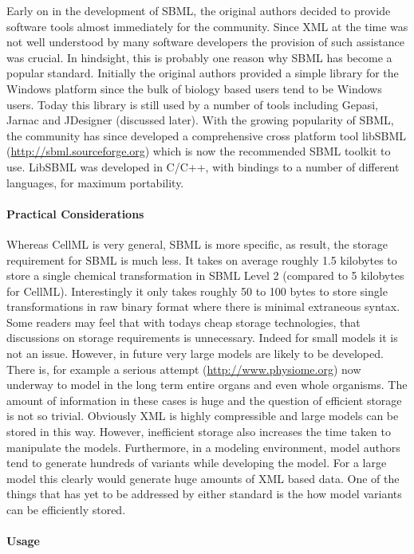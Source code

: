 Early on in the development of SBML, the original authors decided to
provide software tools almost immediately for the community. Since XML
at the time was not well understood by many software developers the
provision of such assistance was crucial. In hindsight, this is probably
one reason why SBML has become a popular standard. Initially the
original authors provided a simple library for the Windows platform
since the bulk of biology based users tend to be Windows users. Today
this library is still used by a number of tools including Gepasi, Jarnac
and JDesigner (discussed later). With the growing popularity of SBML,
the community has since developed a comprehensive cross platform tool
libSBML (\url{http://sbml.sourceforge.org}) which is now the recommended
SBML toolkit to use. LibSBML was developed in C/C++, with bindings to a
number of different languages, for maximum portability.

\paragraph{Practical Considerations}

Whereas CellML is very general, SBML is more specific, as result, the
storage requirement for SBML is much less. It takes on average roughly
1.5 kilobytes to store a single chemical transformation in SBML Level 2
(compared to 5 kilobytes for CellML). Interestingly it only takes
roughly 50 to 100 bytes to store single transformations in raw binary
format where there is minimal extraneous syntax. Some readers may feel
that with todays cheap storage technologies, that discussions on storage
requirements is unnecessary. Indeed for small models it is not an issue.
However, in future very large models are likely to be developed. There
is, for example a serious attempt (\url{http://www.physiome.org}) now
underway to model in the long term entire organs and even whole
organisms. The amount of information in these cases is huge and the
question of efficient storage is not so trivial. Obviously XML is highly
compressible and large models can be stored in this way. However,
inefficient storage also increases the time taken to manipulate the
models. Furthermore, in a modeling environment, model authors tend to
generate hundreds of variants while developing the model. For a large
model this clearly would generate huge amounts of XML based data. One of
the things that has yet to be addressed by either standard is the how
model variants can be efficiently stored.

\paragraph{Usage}

